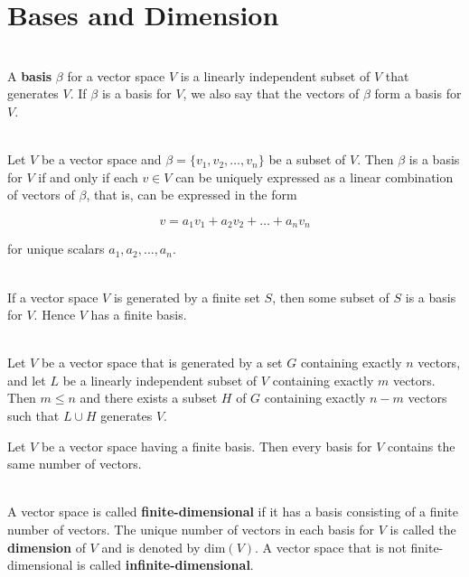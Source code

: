 \section{Bases and Dimension}

\begin{definition}
	\hfill\\
	A \textbf{basis} $\beta$ for a vector space $V$ is a linearly independent subset of $V$ that generates $V$. If $\beta$ is a basis for $V$, we also say that the vectors of $\beta$ form a basis for $V$.
\end{definition}

\begin{theorem}
	\hfill\\
	Let $V$ be a vector space and $\beta = \{v_1, v_2, \dots, v_n\}$ be a subset of $V$. Then $\beta$ is a basis for $V$ if and only if each $v \in V$ can be uniquely expressed as a linear combination of vectors of $\beta$, that is, can be expressed in the form
	
	\[v = a_1v_1 + a_2v_2 + \dots + a_nv_n\]
	
	for unique scalars $a_1, a_2, \dots, a_n$.
\end{theorem}

\begin{theorem}
	\hfill\\
	If a vector space $V$ is generated by a finite set $S$, then some subset of $S$ is a basis for $V$. Hence $V$ has a finite basis.
\end{theorem}

\begin{theorem}
	\hfill\\
	Let $V$ be a vector space that is generated by a set $G$ containing exactly $n$ vectors, and let $L$ be a linearly independent subset of $V$ containing exactly $m$ vectors. Then $m \leq n$ and there exists a subset $H$ of $G$ containing exactly $n-m$ vectors such that $L \cup H$ generates $V$.
\end{theorem}

\begin{corollary}
	Let $V$ be a vector space having a finite basis. Then every basis for $V$ contains the same number of vectors.
\end{corollary}

\begin{definition}
	\hfill\\
	A vector space is called \textbf{finite-dimensional} if it has a basis consisting of a finite number of vectors. The unique number of vectors in each basis for $V$ is called the \textbf{dimension} of $V$ and is denoted by $\text{dim}(V)$. A vector space that is not finite-dimensional is called \textbf{infinite-dimensional}.
\end{definition}


